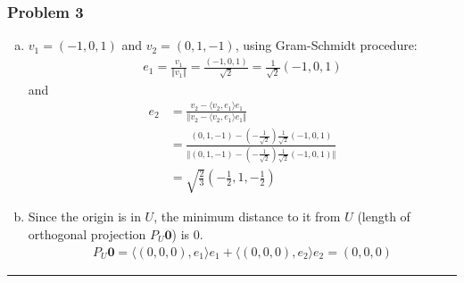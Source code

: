 \documentclass[12pt, letterpaper]{scrartcl}
\begin{document}
\subsubsection*{Problem 3}
\begin{enumerate}[(a)]
    \item $v_1=(-1,0,1)$ and $v_2=(0,1,-1)$, using Gram-Schmidt procedure: 
    \begin{align*}
        e_1=\frac{v_1}{\Vert v_1 \Vert}=\frac{(-1,0,1)}{\sqrt{2}}=\frac{1}{\sqrt{2}}(-1,0,1)
    \end{align*}
    and
    \begin{align*}
        e_2&=\frac{v_2-\langle v_2,e_1\rangle e_1}{\Vert v_2-\langle v_2,e_1\rangle e_1\Vert}\\
        &=\frac{(0,1,-1)-(-\frac{1}{\sqrt{2}})\frac{1}{\sqrt{2}}(-1,0,1)}{\Vert(0,1,-1)-(-\frac{1}{\sqrt{2}})\frac{1}{\sqrt{2}}(-1,0,1)\Vert}\\
        &=\sqrt{\frac{2}{3}}(-\frac{1}{2},1,-\frac{1}{2})
    \end{align*}

    \item 
    Since the origin is in $U$, the minimum distance to it from $U$ (length of orthogonal projection $P_U\mathbf{0}$) is 0.
    \begin{align*}
        P_U\mathbf{0}=\langle(0,0,0),e_1\rangle e_1 + \langle(0,0,0),e_2\rangle e_2=(0,0,0)
    \end{align*}
\end{enumerate}
\vskip1mm\hrule
\end{document}
